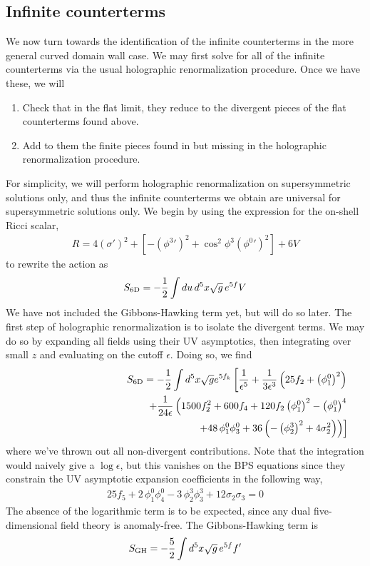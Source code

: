 \documentclass[12pt]{article}
\begin{document}
\subsection{Infinite counterterms}
We now turn towards the identification of the infinite counterterms in the more general curved domain wall case. We may first solve for all of the infinite counterterms via the usual holographic renormalization procedure. Once we have these, we will
\begin{enumerate}
\item Check that in the flat limit, they reduce to the divergent pieces of the flat counterterms found above.
\item Add to them the finite pieces found in but missing in the holographic renormalization procedure. 
\end{enumerate}
For simplicity, we will perform holographic renormalization on supersymmetric solutions only, and thus the infinite counterterms we obtain are universal for supersymmetric solutions only. 
We begin by using the expression for the on-shell Ricci scalar, 
\begin{eqnarray}
R = 4 (\sigma')^2 + \left[-({\phi^3}')^2 + \cos^2 \phi^3 ({\phi^0}')^2 \right] + 6 V
\end{eqnarray}
to rewrite the action as 
\begin{eqnarray}
S_{\mathrm{6D}} = -{1 \over 2} \int du\, d^5 x \sqrt{g} \,e^{5f}  V
\end{eqnarray}
We have not included the Gibbons-Hawking term yet, but will do so later. The first step of holographic renormalization is to isolate the divergent terms. We may do so by expanding all fields using their UV asymptotics, then integrating over small $z$ and evaluating on the cutoff $\epsilon$. Doing so, we find 
\begin{eqnarray}
S_{\mathrm{6D}} = -{1\over 2} \int d^5 x \sqrt{g} e^{5 f_k} \left[{1 \over \epsilon^5} + {1 \over 3 \epsilon^3}\left(25 f_2 + \left(\phi^0_1\right)^2 \right) \right.
\nonumber\\
\hspace{1.3 in} + {1 \over 24\epsilon}\left(1500 f_2^2 + 600 f_4 + 120 f_2 \left(\phi^0_1\right)^2  - \left(\phi^0_1\right)^4 \right.\nonumber\\
\vphantom{.} \hspace{1.1 in}\left. \left.  \hspace{1.3 in}+ 48\, \phi^0_1 \phi^0_3 + 36\left(-\left(\phi^3_2\right)^2 + 4 \sigma_2^2\right)  \right)\right]
\end{eqnarray}
where we've thrown out all non-divergent contributions. Note that the integration would naively give a $\log \epsilon$, but this vanishes on the BPS equations since they constrain the UV asymptotic expansion coefficients in the following way,
\begin{eqnarray}
25 f_5 + 2 \,\phi^0_1 \phi^0_4 - 3 \,\phi^3_2 \phi^3_3 + 12 \sigma_2 \sigma_3 = 0
\end{eqnarray}
The absence of the logarithmic term is to be expected, since any dual five-dimensional field theory is anomaly-free. The Gibbons-Hawking term is 
\begin{eqnarray}
S_{\mathrm{GH}} = -{5 \over 2} \int d^5 x \sqrt{g}\, e^{5f} f'
\end{eqnarray}
\end{document}
